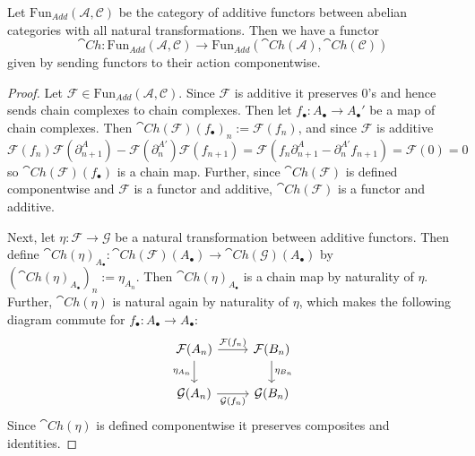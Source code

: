 \begin{lem}[label=lem:funcActChain]
    Let $\text{Fun}_{Add}(\mathcal{A},\mathcal{C})$ be the category of additive functors between abelian categories with all natural transformations. Then we have a functor
    \begin{equation*}
        \cat{Ch}:\text{Fun}_{Add}(\mathcal{A},\mathcal{C})\rightarrow \text{Fun}_{Add}(\cat{Ch}(\mathcal{A}),\cat{Ch}(\mathcal{C}))
    \end{equation*}
    given by sending functors to their action componentwise.
\end{lem}
\begin{proof}
    Let $\mathcal{F} \in \text{Fun}_{Add}(\mathcal{A},\mathcal{C})$. Since $\mathcal{F}$ is additive it preserves $0$'s and hence sends chain complexes to chain complexes. Then let $f_\bullet:A_\bullet\rightarrow A_\bullet'$ be a map of chain complexes. Then $\cat{Ch}(\mathcal{F})(f_\bullet)_n := \mathcal{F}(f_n)$, and since $\mathcal{F}$ is additive
    \begin{equation*}
        \mathcal{F}(f_n)\mathcal{F}(\partial_{n+1}^A)-\mathcal{F}(\partial_n^{A'})\mathcal{F}(f_{n+1}) = \mathcal{F}(f_n\partial_{n+1}^A-\partial_n^{A'}f_{n+1}) = \mathcal{F}(0) = 0
    \end{equation*}
    so $\cat{Ch}(\mathcal{F})(f_\bullet)$ is a chain map. Further, since $\cat{Ch}(\mathcal{F})$ is defined componentwise and $\mathcal{F}$ is a functor and additive, $\cat{Ch}(\mathcal{F})$ is a functor and additive. 


    Next, let $\eta:\mathcal{F}\rightarrow \mathcal{G}$ be a natural transformation between additive functors. Then define $\cat{Ch}(\eta)_{A_\bullet}:\cat{Ch}(\mathcal{F})(A_\bullet)\rightarrow \cat{Ch}(\mathcal{G})(A_\bullet)$ by $(\cat{Ch}(\eta)_{A_\bullet})_n := \eta_{A_n}$. Then $\cat{Ch}(\eta)_{A_\bullet}$ is a chain map by naturality of $\eta$. Further, $\cat{Ch}(\eta)$ is natural again by naturality of $\eta$, which makes the following diagram commute for $f_\bullet:A_\bullet\rightarrow A_\bullet$:
    \[\begin{tikzcd}
    	{\mathcal{F}(A_n)} & {\mathcal{F}(B_n)} \\
    	{\mathcal{G}(A_n)} & {\mathcal{G}(B_n)}
    	\arrow["{\eta_{A_n}}"', from=1-1, to=2-1]
    	\arrow["{\mathcal{G}(f_n)}"', from=2-1, to=2-2]
    	\arrow["{\eta_{B_n}}", from=1-2, to=2-2]
    	\arrow["{\mathcal{F}(f_n)}", from=1-1, to=1-2]
    \end{tikzcd}\]
    Since $\cat{Ch}(\eta)$ is defined componentwise it preserves composites and identities.
\end{proof}

